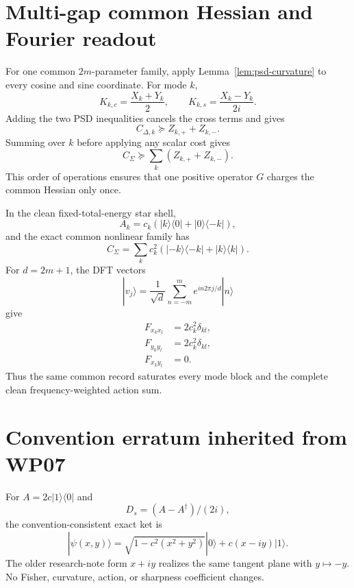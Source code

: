 \documentclass[aps,pra,preprint,nofootinbib]{revtex4-2}
\begin{document}
\section{Multi-gap common Hessian and Fourier readout}
\label{supp:multigap}

For one common $2m$-parameter family, apply Lemma~\ref{lem:psd-curvature} to every cosine and sine coordinate. For mode $k$,
\begin{equation}
K_{k,c}=\frac{X_k+Y_k}{2},
\qquad
K_{k,s}=\frac{X_k-Y_k}{2i}.
\end{equation}
Adding the two PSD inequalities cancels the cross terms and gives
\begin{equation}
C_{\Delta,k}\succeq Z_{k,+}+Z_{k,-}.
\end{equation}
Summing over $k$ before applying any scalar cost gives
\begin{equation}
C_\Sigma\succeq\sum_k(Z_{k,+}+Z_{k,-}).
\end{equation}
This order of operations ensures that one positive operator $G$ charges the common Hessian only once.

In the clean fixed-total-energy star shell,
\begin{equation}
A_k=c_k(|k\rangle\!\langle0|+|0\rangle\!\langle-k|),
\end{equation}
and the exact common nonlinear family has
\begin{equation}
C_\Sigma=\sum_k c_k^2
(|-k\rangle\!\langle-k|+|k\rangle\!\langle k|).
\end{equation}
For $d=2m+1$, the DFT vectors
\begin{equation}
|v_j\rangle=\frac1{\sqrt d}\sum_{n=-m}^{m}e^{in2\pi j/d}|n\rangle
\end{equation}
give
\begin{align}
F_{x_kx_l}&=2c_k^2\delta_{kl},\\
F_{y_ky_l}&=2c_k^2\delta_{kl},\\
F_{x_ky_l}&=0.
\end{align}
Thus the same common record saturates every mode block and the complete clean frequency-weighted action sum.

\section{Convention erratum inherited from WP07}

For $A=2c|1\rangle\langle0|$ and
\begin{equation}
D_s=(A-A^\dagger)/(2i),
\end{equation}
the convention-consistent exact ket is
\begin{equation}
|\psi(x,y)\rangle=
\sqrt{1-c^2(x^2+y^2)}|0\rangle+c(x-i y)|1\rangle.
\end{equation}
The older research-note form $x+i y$ realizes the same tangent plane with $y\mapsto-y$. No Fisher, curvature, action, or sharpness coefficient changes.


\end{document}
